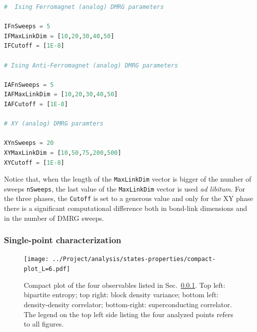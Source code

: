 \begin{lstlisting}[language=julia]
#  Ising Ferromagnet (analog) DMRG parameters

IFnSweeps = 5
IFMaxLinkDim = [10,20,30,40,50]
IFCutoff = [1E-8]

# Ising Anti-Ferromagnet (analog) DMRG parameters

IAFnSweeps = 5
IAFMaxLinkDim = [10,20,30,40,50]
IAFCutoff = [1E-8]

# XY (analog) DMRG paramters

XYnSweeps = 20
XYMaxLinkDim = [10,50,75,200,500]
XYCutoff = [1E-8]
\end{lstlisting}

\noindent Notice that, when the length of the \texttt{MaxLinkDim} vector is bigger of the number of sweeps \texttt{nSweeps}, the last value of the \texttt{MaxLinkDim} vector is used \textit{ad libitum}. For the three phases, the \texttt{Cutoff} is set to a generous value and only for the $\mathrm{XY}$ phase there is a significant computational difference both in bond-link dimensions and in the number of DMRG sweeps. 

\subsubsection{Single-point characterization}\label{subsubsec:single-point-characterization}

\begin{figure}
	\centering
	\texttt{[image: ../Project/analysis/states-properties/compact-plot\_L=6.pdf]}
	\caption{Compact plot of the four observables listed in Sec.~\ref{subsubsec:single-point-characterization}. Top left: bipartite entropy; top right: block density variance; bottom left: density-density correlator; bottom-right: superconducting correlator. The legend on the top left side listing the four analyzed points refers to all figures.}
	\label{fig:compact-plot}
\end{figure}

